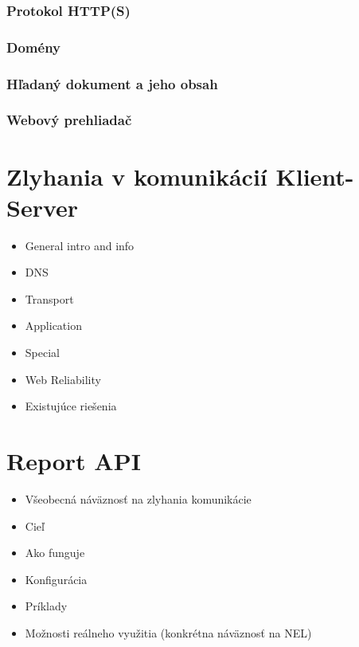 \subsubsection{Protokol HTTP(S)}

\subsubsection{Domény}

\subsubsection{Hľadaný dokument a jeho obsah}

\subsubsection{Webový prehliadač}


\section{Zlyhania v komunikácií Klient-Server}
\begin{itemize}
    \item General intro and info
    \item DNS
    \item Transport
    \item Application
    \item Special
    \item Web Reliability
    \item Existujúce riešenia
\end{itemize}

\section{Report API}
\begin{itemize}
    \item Všeobecná náväznosť na zlyhania komunikácie
    \item Cieľ
    \item Ako funguje
    \item Konfigurácia
    \item Príklady
    \item Možnosti reálneho využitia (konkrétna náväznosť na NEL)
\end{itemize}

